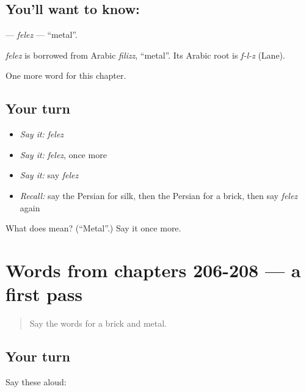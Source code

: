 \subsection*{You'll want to know: }
\textbf{} — \emph{felez} — \textquotedblleft{}metal\textquotedblright{}.

\begin{cousinweb}
\emph{felez} is borrowed from Arabic \emph{filizz}, \textquotedblleft{}metal\textquotedblright{}. Its Arabic root is \emph{f-l-z} (Lane).
\end{cousinweb}

\begin{grammarlens}[title={What you've built}]
One more word for this chapter.
\end{grammarlens}

\subsection*{Your turn}
\begin{itemize}
\raggedright
  \item \emph{Say it:} \emph{felez}
  \item \emph{Say it:} \emph{felez}, once more
  \item \emph{Say it:} say \emph{felez}
  \item \emph{Recall:} say the Persian for silk, then the Persian for a brick, then say \emph{felez} again
\end{itemize}

\begin{tcolorbox}[breakable,colback=teal!4,colframe=teal!35!black,title={Before you move on}]
What does  mean? (\textquotedblleft{}Metal\textquotedblright{}.) Say it once more.
\end{tcolorbox}
\section[(dialogue)]{Words from chapters 206-208 — a first pass}

\label{lesson:FA-R211-first-pass-words-from-chapters-206-208}



\begin{quote}
Say the words for a brick and metal.
\end{quote}

\subsection*{Your turn}
Say these aloud:

